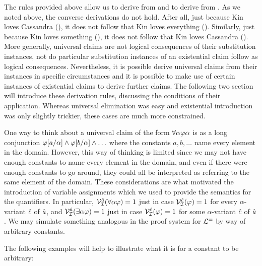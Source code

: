 The rules provided above allow us to derive  from  and to derive  from .
As we noted above, the converse derivations do not hold.
After all, just because Kin loves Cassandra (), it does not follow that Kin loves everything ().
Similarly, just because Kin loves something (), it does not follow that Kin loves Cassandra ().
More generally, universal claims are not logical consequences of their substitution instances, not do particular substitution instances of an existential claim follow as logical consequences.
Nevertheless, it is possible derive universal claims from their instances in specific circumstances and it is possible to make use of certain instances of existential claims to derive further claims.
The following two section will introduce these derivation rules, discussing the conditions of their application.
Whereas universal elimination was easy and existential introduction was only slightly trickier, these cases are much more constrained.

One way to think about a universal claim of the form $\forall \alpha\varphi\alpha$ is as a long conjunction $\varphi[a/\alpha] \wedge \varphi[b/\alpha] \wedge\ldots$ where the constants $a,b,\ldots$ name every element in the domain.
However, this way of thinking is limited since we may not have enough constants to name every element in the domain, and even if there were enough constants to go around, they could all be interpreted as referring to the same element of the domain.
These considerations are what motivated the introduction of variable assignments which we used to provide the semantics for the quantifiers.
In particular, $\mathcal{V}_{\mathcal{I}}^{\hat{a}}(\forall \alpha\varphi)=1$ just in case $\mathcal{V}_{\mathcal{I}}^{\hat{c}}(\varphi)=1$ for every $\alpha$-variant $\hat{c}$ of $\hat{a}$, and $\mathcal{V}_{\mathcal{I}}^{\hat{a}}(\exists \alpha\varphi)=1$ just in case $\mathcal{V}_{\mathcal{I}}^{\hat{c}}(\varphi)=1$ for some $\alpha$-variant $\hat{c}$ of $\hat{a}$.
We may simulate something analogous in the proof system for $\mathcal{L}^{=}$ by way of arbitrary constants.

The following examples will help to illustrate what it is for a constant to be arbitrary:

\begin{earg} \label{arb}
\end{earg}

